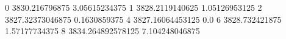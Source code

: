 0 3830.216796875 3.05615234375
1 3828.2119140625 1.05126953125
2 3827.32373046875 0.1630859375
4 3827.16064453125 0.0
6 3828.732421875 1.57177734375
8 3834.264892578125 7.104248046875
